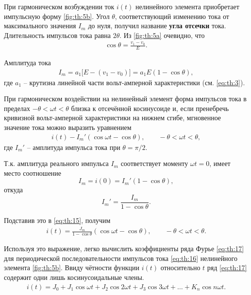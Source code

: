 \documentclass[14pt]{extarticle}
\begin{document}
	При гармоническом возбуждении ток $i(t)$ нелинейного элемента приобретает импульсную форму \cref{fig:th:5b}. Угол $\theta$, соответствующий изменению тока от максимального значения $I_m$ до нуля, получил название \textbf{угла отсечки} тока. Длительность импульсов тока равна $2\theta$. Из \cref{fig:th:5a} очевидно, что 
	\begin{align} \label{eq:th:13}
		\cos \theta = \frac{v_1 - v_0}{E}.
	\end{align}
	
	Амплитуда тока
	\begin{align} \label{eq:th:14}
		I_m = a_1 \big[E - (v_1 - v_0)\big] = a_1 E(1 - \cos \theta),
	\end{align}
	где $a_1$ -- крутизна линейной части вольт-амперной характеристики (см. \cref{eq:th:3}).
	
	При гармоническом воздействии на нелинейный элемент форма импульсов тока в пределах $-\theta < \omega t < \theta$ близка к отсечённой косинусоиде и, если пренебречь кривизной вольт-амперной характеристики на нижнем сгибе, мгновенное значение тока можно выразить уравнением
	\begin{align} \label{eq:th:15}
		i(t) - I_m'(\cos \omega t - \cos \theta), \qquad -\theta < \omega t < \theta,
	\end{align} 
	где $I_m'$ -- амплитуда импульса тока при $\theta = \pi/2$.
	
	Т.к. амплитуда реального импульса $I_m$ соответствует моменту $\omega t = 0$, имеет место соотношение
	\[
	I_m = i(0) = I_m'(1 - \cos \theta),
	\] 
	откуда
	\[
	I_m' = \frac{I_m}{1 - \cos \theta}.
	\]
	
	Подставив это в \cref{eq:th:15}, получим
	\begin{align} \label{eq:th:16}
		i(t) = \frac{J_m}{1 - \cos \theta} (\cos \omega t - \cos \theta), \qquad - \theta < \omega t < \theta.
	\end{align}
	
	Используя это выражение, легко вычислить коэффициенты ряда Фурье \cref{eq:th:17} для периодической последовательности импульсов тока \cref{eq:th:16} нелинейного элемента \cref{fig:th:5b}. Ввиду чётности функции $i(t)$ относительно $t$ ряд \cref{eq:th:17} содержит одни лишь косинусоидальные члены.
	\begin{align} \label{eq:th:17}
		i(t) = J_0 + J_1 \cos \omega t + J_2 \cos 2\omega t + J_3 \cos 3\omega t + \dots + K_n \cos n \omega t.
	\end{align} 
	
\end{document}
